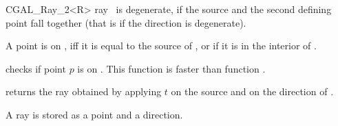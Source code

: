 \begin{ccClassTemplate} {CGAL_Ray_2<R>}
       {ray \ccVar\ is degenerate, if the source and the second defining
        point fall together (that is if the direction is degenerate).}

       {}

       {}

       {A point is on \ccVar, iff it is equal to the source
        of \ccVar, or if it is in the interior of \ccVar.}

       {checks if point $p$ is on \ccVar. This function is faster
        than function .
        }

       {returns the ray obtained by applying $t$ on the source
        and on the direction of \ccVar.}

\ccImplementation

A ray is stored as a point and a direction.


\end{ccClassTemplate} 

%
%
%

